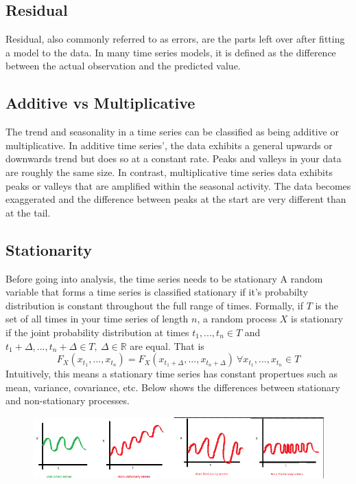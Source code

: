 \documentclass{article}
\begin{document}
  \subsection{Residual}
  Residual, also commonly referred to as errors, are the parts left over after fitting a model to the data. In many time series models, it is defined as the difference between the actual observation and the predicted value.
  
  \subsection{Additive vs Multiplicative}
  The trend and seasonality in a time series can be classified as being additive or multiplicative.
  In additive time series', the data exhibits a general upwards or downwards trend but does so at a constant rate. Peaks and valleys in your data are roughly the same size.
  In contrast, multiplicative time series data exhibits peaks or valleys that are amplified within the seasonal activity. The data becomes exaggerated and the difference between peaks at the start are very different than at the tail.
  \newpage
  \subsection{Stationarity}
  Before going into analysis, the time series needs to be stationary
  A random variable that forms a time series is classified stationary if it's probabilty distribution is constant throughout the full range of times. 
  Formally, if $T$ is the set of all times in your time series of length $n$, a random process $X$ is stationary if the joint probability distribution at times $t_1,...,t_n \in T$ and $t_1+\Delta,...,t_n+\Delta \in T,\  \Delta \in \mathbb{R}$ are equal. That is
  \begin{equation}
    F_{X}(x_{t_1},...,x_{t_n}) = F_{X}(x_{{t_1}+\Delta},...,x_{{t_n}+\Delta})\ \forall x_{t_1},...,x_{t_n} \in T
  \end{equation}
  Intuitively, this means a stationary time series has constant propertues such as mean, variance, covariance, etc. Below shows the differences between stationary and non-stationary processes.
  \begin{figure}[H]
    \centering
    \includegraphics[scale=0.8]{stationary_time_series.png}
  \end{figure}
\end{document}
